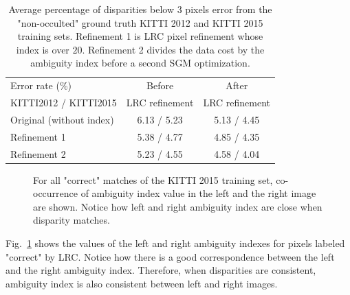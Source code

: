 \documentclass{article}
\begin{document}
\begin{table}
\centering
\begin{tabular}{|l|c|c|}
  \hline
  Error rate (\%) & Before & After \\
  KITTI2012 / KITTI2015      &  LRC refinement & LRC refinement \\
  \hline
  Original (without index) & 6.13 / 5.23 & 5.13 / 4.45 \\
  Refinement 1 & 5.38 / 4.77 & 4.85 / 4.35 \\
  Refinement 2 & 5.23 / 4.55 & 4.58 / 4.04 \\
  \hline
\end{tabular}
\caption{Average percentage of disparities below 3 pixels error from the "non-occulted" ground truth KITTI 2012 and KITTI 2015 training sets. Refinement 1 is LRC pixel refinement whose index is over $20$. Refinement 2 divides the data cost by the ambiguity index before a second SGM optimization.}
\label{tab:KITTI}
\end{table}

\begin{figure}
\begin{center}
\end{center}
\caption{For all "correct" matches of the KITTI 2015 training set, co-occurrence of ambiguity index value in the left and the right image are shown. Notice how left and right ambiguity index are close when disparity matches.}
\label{fig:LR_ind}
\end{figure}

Fig.~\ref{fig:LR_ind} shows the values of the left and right ambiguity indexes for pixels labeled "correct" by LRC. Notice how there is a good correspondence between the left and the right ambiguity index. Therefore, when disparities are consistent, ambiguity index is also consistent between left and right images.
\end{document}
